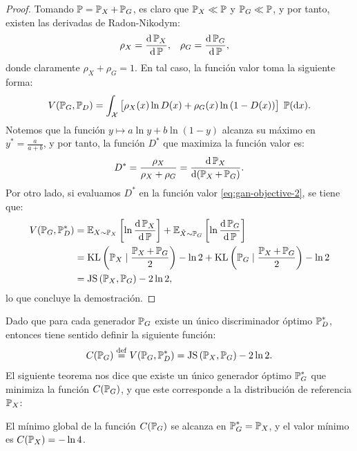 {{\begin{proof}
    Tomando $\Prob = \Prob_X + \Prob_G$, es claro que $\Prob_X \ll \Prob$ y $\Prob_G \ll \Prob$, y por tanto, existen las derivadas de Radon-Nikodym:
    \begin{align*}
        \rho_X & = \dv{\Prob_X}{\Prob}, & \rho_G & = \dv{\Prob_G}{\Prob},
    \end{align*}
    donde claramente $\rho_X + \rho_G = 1$. En tal caso, la función valor toma la siguiente forma:
    \begin{equation}
        \label{eq:gan-objective-2}
        V(\Prob_G, \Prob_D) = \int_\cX \big[ \rho_X(x) \ln D(x) + \rho_G(x) \ln \qty(1 - D(x)) \big] \; \Prob(\dd x).
    \end{equation}
    Notemos que la función $y \mapsto a \ln y + b \ln(1-y)$ alcanza su máximo en $y^\ast = \frac{a}{a+b}$, y por tanto, la función $D^\ast$ que maximiza la función valor es:
    \begin{equation}
        D^\ast = \frac{\rho_X}{\rho_X + \rho_G} = \dv{\Prob_X}{(\Prob_X + \Prob_G)} .
    \end{equation}
    Por otro lado, si evaluamos $D^\ast$ en la función valor \eqref{eq:gan-objective-2}, se tiene que:
    \begin{align*}
        V(\Prob_G, \Prob_D^\ast)
         & = \Exp_{X \sim \Prob_X} \left[ \ln \dv{\Prob_X}{\Prob}(X) \right] + \Exp_{\tilde X \sim \Prob_G} \left[ \ln \dv{\Prob_G}{\Prob}(\tilde X) \right] \\
         & = \KL{\Prob_X}{\frac{\Prob_X + \Prob_G}{2}} - \ln 2 + \KL{\Prob_G}{\frac{\Prob_X + \Prob_G}{2}} - \ln 2                                           \\
         & = \JS{\Prob_X}{\Prob_G} - 2 \ln 2,
    \end{align*}
    lo que concluye la demostración.
\end{proof}

Dado que para cada generador $\Prob_G$ existe un único discriminador óptimo $\Prob_D^\ast$, entonces tiene sentido definir la siguiente función:
\begin{equation}
    C(\Prob_G) \eqdef V(\Prob_G, \Prob_D^\ast) = \JS{\Prob_X}{\Prob_G} - 2 \ln 2.
\end{equation}
El siguiente teorema nos dice que existe un único generador óptimo $\Prob_G^\ast$ que minimiza la función $C(\Prob_G)$, y que este corresponde a la distribución de referencia $\Prob_X$:

\begin{theorem}
    El mínimo global de la función $C(\Prob_G)$ se alcanza en $\Prob_G^\ast = \Prob_X$, y el valor mínimo es $C(\Prob_X) = - \ln 4$.
\end{theorem}

}}
